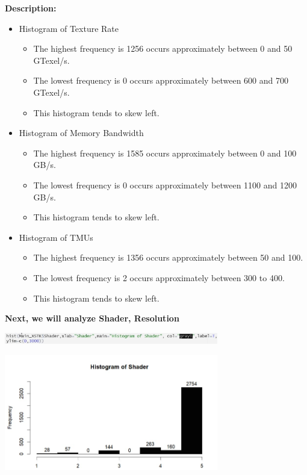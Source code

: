 \textbf{Description:}
\begin{itemize}
    \item Histogram of Texture Rate
    \begin{itemize}
        \item The highest frequency is 1256 occurs approximately between 0 and 50 GTexel/s.
        \item The lowest frequency is 0 occurs approximately between 600 and 700 GTexel/s.
        \item This histogram tends to skew left.
    \end{itemize}

    \item Histogram of Memory Bandwidth
    \begin{itemize}
        \item The highest frequency is 1585 occurs approximately between 0 and 100 GB/s.
        \item The lowest frequency is 0 occurs approximately between 1100 and 1200 GB/s.
        \item  This histogram tends to skew left.
    \end{itemize}
    \item Histogram of TMUs
    \begin{itemize}
        \item The highest frequency is 1356 occurs approximately between 50 and 100.
        \item The lowest frequency is 2 occurs approximately between 300 to 400.
        \item This histogram tends to skew left.
    \end{itemize}
\end{itemize}
\textbf{Next, we will analyze Shader, Resolution} 
\begin{center}
    \includegraphics[width=0.7\textwidth]{shader.png}
\end{center}
\begin{center}
    \includegraphics[width=0.7\textwidth]{shader1.png}
\end{center}
